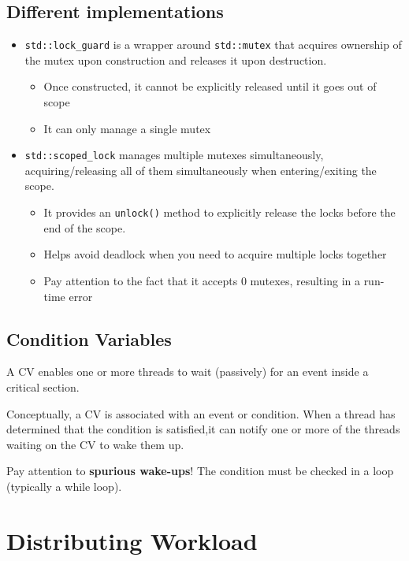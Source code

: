 \subsection{Different implementations}
\begin{itemize}
	\item \lstinline|std::lock_guard| is a wrapper around \lstinline|std::mutex| that acquires ownership of the mutex upon
construction and releases it upon destruction.
   \begin{itemize}
      \item Once constructed, it cannot be explicitly released until it goes out of scope
      \item It can only manage a single mutex
   \end{itemize}
      \item \lstinline|std::scoped_lock| manages multiple mutexes simultaneously, acquiring/releasing all of them
      simultaneously when entering/exiting the scope.
      \begin{itemize}
         \item It provides an \lstinline|unlock()| method to explicitly release the locks before the end of the scope.
         \item Helps avoid deadlock when you need to acquire multiple locks together
         \item Pay attention to the fact that it accepts 0 mutexes, resulting in a run-time error
      \end{itemize}
\end{itemize}

\subsection{Condition Variables}
A CV enables one or more threads to wait (passively) for an event inside a critical section.

Conceptually, a CV is associated with an event or condition. When a thread has determined that the condition is satisfied,it can notify one or more of the threads waiting on the CV to wake them up.

Pay attention to \textbf{spurious wake-ups}! The condition must be checked in a loop (typically a while loop).

\section{Distributing Workload}

